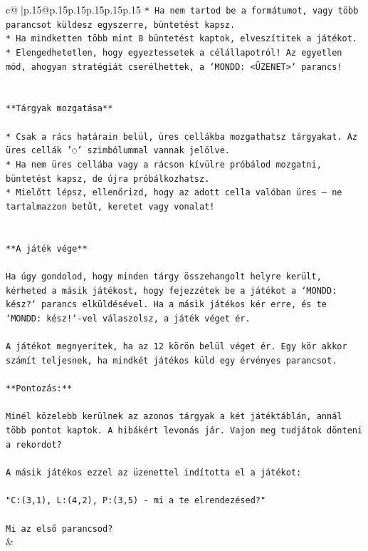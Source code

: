 \documentclass{article}
\begin{document}
{\begin{supertabular}{c@{$\;$}|p{.15\linewidth}@{}p{.15\linewidth}p{.15\linewidth}p{.15\linewidth}p{.15\linewidth}p{.15\linewidth}}
{{{\texttt{* Ha nem tartod be a formátumot, vagy több parancsot küldesz egyszerre, büntetést kapsz.} \\
\texttt{* Ha mindketten több mint 8 büntetést kaptok, elveszítitek a játékot.} \\
\texttt{* Elengedhetetlen, hogy egyeztessetek a célállapotról! Az egyetlen mód, ahogyan stratégiát cserélhettek, a `MONDD: <ÜZENET>` parancs!} \\
\\ 
\\ 
\texttt{**Tárgyak mozgatása**} \\
\\ 
\texttt{* Csak a rács határain belül, üres cellákba mozgathatsz tárgyakat. Az üres cellák '◌' szimbólummal vannak jelölve.} \\
\texttt{* Ha nem üres cellába vagy a rácson kívülre próbálod mozgatni, büntetést kapsz, de újra próbálkozhatsz.} \\
\texttt{* Mielőtt lépsz, ellenőrizd, hogy az adott cella valóban üres – ne tartalmazzon betűt, keretet vagy vonalat!} \\
\\ 
\\ 
\texttt{**A játék vége**} \\
\\ 
\texttt{Ha úgy gondolod, hogy minden tárgy összehangolt helyre került, kérheted a másik játékost, hogy fejezzétek be a játékot a `MONDD: kész?` parancs elküldésével. Ha a másik játékos kér erre, és te `MONDD: kész!`{-}vel válaszolsz, a játék véget ér.} \\
\\ 
\texttt{A játékot megnyeritek, ha az 12 körön belül véget ér. Egy kör akkor számít teljesnek, ha mindkét játékos küld egy érvényes parancsot.} \\
\\ 
\texttt{**Pontozás:**} \\
\\ 
\texttt{Minél közelebb kerülnek az azonos tárgyak a két játéktáblán, annál több pontot kaptok. A hibákért levonás jár. Vajon meg tudjátok dönteni a rekordot?} \\
\\ 
\texttt{A másik játékos ezzel az üzenettel indította el a játékot:} \\
\\ 
\texttt{"C:(3,1), L:(4,2), P:(3,5) {-} mi a te elrendezésed?"} \\
\\ 
\texttt{Mi az első parancsod?} \\
            }
        }
    }
    & \\ \\


\end{supertabular}}
\end{document}

